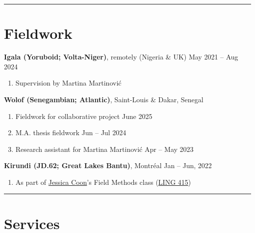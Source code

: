 \documentclass[margin,line]{resume}
\begin{document}
\begin{resume}
	\vspace{-0.9em}\rule{\textwidth}{0.4pt}





		\vspace{-0.5em}

		\section{\mysidestyle Fieldwork}

		\textbf{Igala (Yoruboid; Volta-Niger)}, remotely (Nigeria \& UK) \hfill May 2021 -- Aug 2024
		\begin{enumerate}[-, leftmargin=1em, topsep=2pt]
			\item[] Supervision by Martina Martinović
		\end{enumerate}
	
	
		\textbf{Wolof (Senegambian; Atlantic)}, Saint-Louis \& Dakar, Senegal %
		\begin{enumerate}[-, leftmargin=1em, topsep=2pt]
			\item[] Fieldwork for collaborative project \hfill June 2025
			\item[] M.A. thesis fieldwork \hfill Jun -- Jul 2024
			\item[] Research assistant for Martina Martinović \hfill Apr -- May 2023
		\end{enumerate}
	
		\textbf{Kirundi (JD.62; Great Lakes Bantu)}, Montr\'{e}al \hfill Jan -- Jun, 2022
		\begin{enumerate}[-, leftmargin=1em, topsep=2pt]
			\item[] As part of \href{https://jessica.lingspace.org/}{Jessica Coon}'s Field Methods class (\href{https://www.mcgill.ca/study/2021-2022/courses/ling-415}{LING 415})
		\end{enumerate}
	
		\vspace{-0.9em}\rule{\textwidth}{0.4pt}


	\vspace{-0.5em}

	\section{\mysidestyle Services}


\end{resume}
\end{document}
